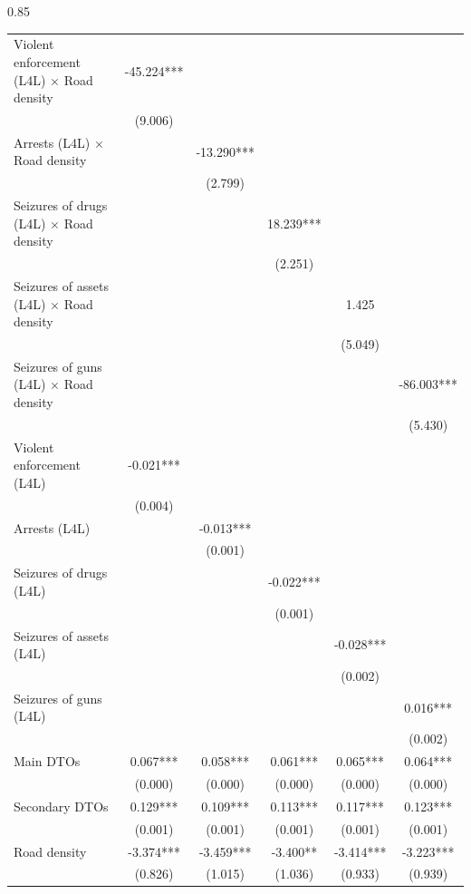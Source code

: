 \documentclass[12pt,letterpaper]{article}
\begin{document}
\begin{landscape}
\begin{center}
\begin{spacing}{0.85}
\begin{longtable}{lccccc}
Violent enforcement (L4L) $\times$ Road density & -45.224*** & & & & \\ 
 & (9.006) & & & & \\ 
Arrests (L4L) $\times$ Road density & & -13.290*** & & & \\ 
 & & (2.799) & & & \\ 
Seizures of drugs (L4L) $\times$ Road density & & & 18.239*** & & \\ 
 & & & (2.251) & & \\ 
Seizures of assets (L4L) $\times$ Road density & & & & 1.425 & \\ 
 & & & & (5.049) & \\ 
Seizures of guns (L4L) $\times$ Road density & & & & & -86.003*** \\ 
 & & & & & (5.430) \\ 
 
Violent enforcement (L4L) & -0.021*** & & & & \\ 
 & (0.004) & & & & \\ 
Arrests (L4L) & & -0.013*** & & & \\ 
 & & (0.001) & & & \\ 
Seizures of drugs (L4L) & & & -0.022*** & & \\ 
 & & & (0.001) & & \\ 
Seizures of assets (L4L) & & & & -0.028*** & \\ 
 & & & & (0.002) & \\ 
Seizures of guns (L4L) & & & & & 0.016*** \\ 
 & & & & & (0.002) \\ 
 
Main DTOs & 0.067*** & 0.058*** & 0.061*** & 0.065*** & 0.064*** \\ 
 & (0.000) & (0.000) & (0.000) & (0.000) & (0.000) \\ 
Secondary DTOs & 0.129*** & 0.109*** & 0.113*** & 0.117*** & 0.123*** \\ 
 & (0.001) & (0.001) & (0.001) & (0.001) & (0.001) \\ 
Road density & -3.374*** & -3.459*** & -3.400** & -3.414*** & -3.223*** \\ 
 & (0.826) & (1.015) & (1.036) & (0.933) & (0.939) \\ 
 

\end{longtable}
\end{spacing}
\end{center}
\end{landscape}
\end{document}
